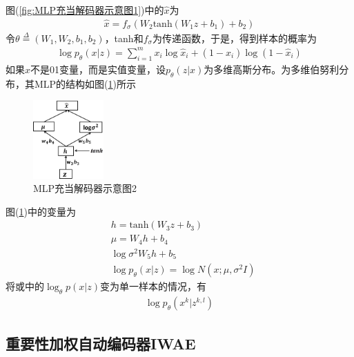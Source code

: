             图(\ref{fig:MLP充当解码器示意图1})中的$\hat{x}$为
            \begin{align*}
            \hat{x} = f_\sigma (W_2\mathrm{tanh}(W_1z+b_1)+b_2)
            \end{align*}
            令$\theta \overset{\Delta}{=} (W_1,W_2,b_1,b_2)$，tanh和$f_\sigma$为传递函数，于是，得到样本的概率为
            \begin{align*}
            \log p_\theta(x|z) = \sum_{i=1}^m x_i \log \hat{x}_i + (1-\hat{x}_i)\log (1-\hat{x}_i)
            \end{align*}
            如果$x$不是01变量，而是实值变量，设$p_\theta(z|x)$为多维高斯分布。为多维伯努利分布，其MLP的结构如图(\ref{fig:MLP充当解码器示意图2})所示
            \begin{figure}[H]
            \centering
            \includegraphics[height=3cm]{images/MLP_acts_as_decoder2.png}
            \caption{MLP充当解码器示意图2}
            \label{fig:MLP充当解码器示意图2}
            \end{figure}
            图(\ref{fig:MLP充当解码器示意图2})中的变量为
            \begin{align*}
            & h=\mathrm{tanh}(W_3z+b_3)\\
            & \mu=W_4h+b_4\\
            & \log \sigma^2 W_5h+b_5\\
            & \log p_\theta (x|z) = \log N(x;\mu,\sigma^2I)
            \end{align*}
            将或中的$\log_\theta p(x|z)$变为单一样本的情况，有
            \begin{align*}
            \log p_\theta (x^k|z^{k,l})
            \end{align*}
    \subsection{重要性加权自动编码器IWAE}
